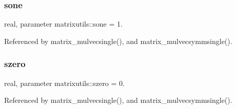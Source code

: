 \mbox{\label{namespacematrixutils_ae2555bb8da14eb27afe68ae794a858fb}} 
\subsubsection{\texorpdfstring{sone}{sone}}
{\footnotesize\ttfamily real, parameter matrixutils\+::sone = 1.}



Referenced by matrix\+\_\+mulvecsingle(), and matrix\+\_\+mulvecsymmsingle().

\mbox{\label{namespacematrixutils_ac00ea25825f3cb1ff949a87fad42094f}} 
\subsubsection{\texorpdfstring{szero}{szero}}
{\footnotesize\ttfamily real, parameter matrixutils\+::szero = 0.}



Referenced by matrix\+\_\+mulvecsingle(), and matrix\+\_\+mulvecsymmsingle().

